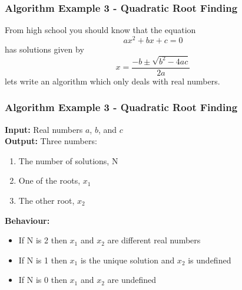 \documentclass[14pt]{beamer}
\begin{document}
\begin{frame} %
\frametitle{Algorithm Example 3 - Quadratic Root Finding}
From high school you should know that the equation
\begin{equation}
a x^2 + b x + c = 0
\end{equation}
has solutions given by
\begin{equation}
x = \frac{-b \pm \sqrt{b^2 - 4 a c}}{2a}
\end{equation}
lets write an algorithm which only deals with real numbers.
\end{frame}

\begin{frame} %
\frametitle{Algorithm Example 3 - Quadratic Root Finding}
{\footnotesize
\textbf{Input:} Real numbers $a$, $b$, and $c$ \\
\textbf{Output:} Three numbers:
\begin{enumerate}
\item The number of solutions, N
\item One of the roots, $x_1$
\item The other root, $x_2$
\end{enumerate}
\textbf{Behaviour:}
\begin{itemize}
\item If N is 2 then $x_1$ and $x_2$ are different real numbers
\item If N is 1 then $x_1$ is the unique solution and $x_2$ is undefined
\item If N is 0 then $x_1$ and $x_2$ are undefined
\end{itemize} 
} 
\end{frame}
\end{document}
